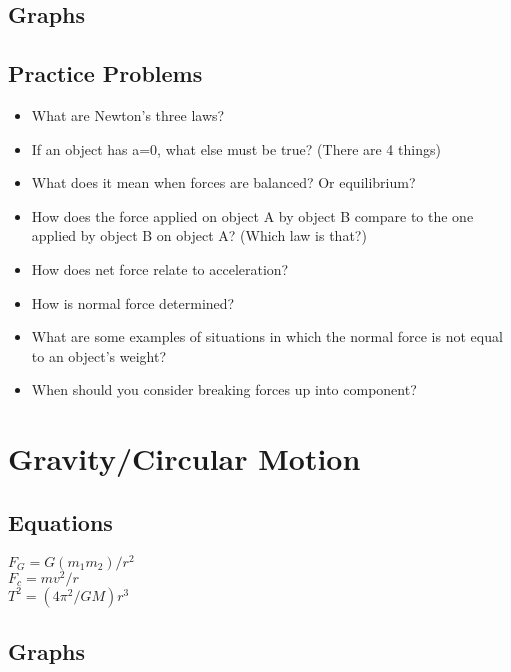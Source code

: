 \documentclass[11pt]{article}
\begin{document}
\subsection*{Graphs}
\label{sec:org7907e4c}
\subsection*{Practice Problems}
\label{sec:org40210a3}
\begin{itemize}
\item What are Newton’s three laws?
\item If an object has a=0, what else must be true? (There are 4 things)
\item What does it mean when forces are balanced? Or equilibrium?
\item How does the force applied on object A by object B compare to the one applied by object B on object A? (Which law is that?)
\item How does net force relate to acceleration?
\item How is normal force determined?
\item What are some examples of situations in which the normal force is not equal to an object’s weight?
\item When should you consider breaking forces up into component?
\end{itemize}

\section*{Gravity/Circular Motion}
\label{sec:org5205031}
\subsection*{Equations}
\label{sec:org8e69145}
\(F_G=G(m_1m_2)/r^2\) \\
\(F_c=mv^2/r\) \\
\(T^2=(4\pi ^2/GM)r^3\) \\
\subsection*{Graphs}
\label{sec:org7bc4bf7}
\end{document}

